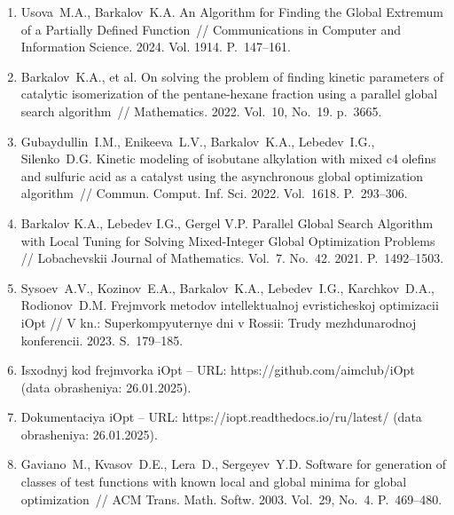 \documentclass[a4paper,12pt,russian]{article}
\begin{document}
\begin{enumerate}
\item \label{rfa:enlit:Usova2024}
Usova~M.A., Barkalov~K.A. An Algorithm for Finding the Global Extremum of a Partially Defined Function~// Communications in Computer and Information Science. 2024. Vol. 1914. P.~147--161. %


\item \label{rfa:enlit:Barkalov2022}
Barkalov~K.A., et al. On solving the problem of finding kinetic parameters of catalytic isomerization of the pentane-hexane fraction using a parallel global search algorithm~// 
Mathematics. 2022. Vol.~10, No.~19. p.~3665. %

\item \label{rfa:enlit:Gubaydullin2022}
Gubaydullin~I.M., Enikeeva~L.V., Barkalov~K.A., Lebedev~I.G., Silenko~D.G. Kinetic modeling of isobutane alkylation with mixed c4 olefins and sulfuric acid as a catalyst using the asynchronous global optimization algorithm~// Commun. Comput. Inf. Sci. 2022. Vol.~1618. P.~293--306. %

\item \label{rfa:enlit:Barkalov2021}
Barkalov K.A., Lebedev I.G., Gergel V.P. Parallel Global Search Algorithm with Local Tuning for Solving Mixed-Integer Global Optimization Problems // Lobachevskii Journal of Mathematics. Vol.~7. No.~42. 2021. P.~1492--1503.

\item \label{rfa:enlit:iOptPaper}
Sysoev~A.V., Kozinov~E.A., Barkalov~K.A., Lebedev~I.G., Karchkov~D.A., Rodionov~D.M. Frejmvork metodov intellektualnoj evristicheskoj optimizacii iOpt // V kn.: Su\-per\-kom\-pyu\-ter\-nye dni v Rossii: Trudy mezhdunarodnoj konferencii. 2023. S.~179--185.

\item \label{rfa:enlit:iOptGithub}
Isxodnyj kod frejmvorka iOpt -- URL: https://github.com/aimclub/iOpt (data ob\-ra\-she\-ni\-ya: 26.01.2025).

\item \label{rfa:enlit:iOptDocs}
Dokumentaciya iOpt -- URL: https://iopt.readthedocs.io/ru/latest/ (data ob\-ra\-she\-ni\-ya: 26.01.2025).

\item \label{rfa:enlit:Gaviano2003}
Gaviano~M., Kvasov~D.E., Lera~D., Sergeyev~Y.D. Software for generation of classes of test functions with known local and global minima for global optimization~// ACM Trans. Math. Softw. 2003. Vol.~29, No.~4. P.~469--480.


\end{enumerate}
\end{document}
